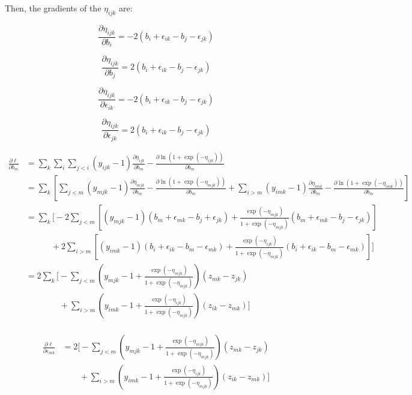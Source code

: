 \documentclass{article}
\begin{document}
Then, the gradients of the $\eta_{ijk}$ are:

\[
\frac{\partial \eta_{ijk}}{\partial b_{i}} =  - 2(b_i + \epsilon_{ik} - b_j - \epsilon_{jk})
\]

\[
\frac{\partial \eta_{ijk}}{\partial b_{j}} = 2(b_i + \epsilon_{ik} - b_j - \epsilon_{jk})
\]

\[
\frac{\partial \eta_{ijk}}{\partial \epsilon_{ik}} = - 2(b_i + \epsilon_{ik} - b_j - \epsilon_{jk})
\]

\[
\frac{\partial \eta_{ijk}}{\partial \epsilon_{jk}} = 2(b_i + \epsilon_{ik} - b_j - \epsilon_{jk})
\]

\begin{align*}
\frac{\partial \ell}{\partial b_{m}} & =  \sum_k \sum_{i}  \sum_{j<i} (y_{ijk} -1)\frac{\partial \eta_{ijk}}{\partial b_{m}} - \frac{\partial \ln (1+\exp(-\eta_{ijk}))}{\partial b_{m}} \\
& =  \sum_k\left[ \sum_{j<m} (y_{mjk} -1)\frac{\partial \eta_{mjk}}{\partial b_{m}} - \frac{\partial \ln (1+\exp(-\eta_{mjk}))}{\partial b_{m}} +  \sum_{i > m} (y_{imk} -1)\frac{\partial \eta_{imk}}{\partial b_{m}} - \frac{\partial \ln (1+\exp(-\eta_{imk}))}{\partial b_{m}} \right] \\
%
& =  \sum_k\bigg[ -2 \sum_{j<m} \left[(y_{mjk} -1)(b_m + \epsilon_{mk} - b_j + \epsilon_{jk}) + \frac{\exp(-\eta_{mjk})}{1+\exp(-\eta_{mjk})}(b_m + \epsilon_{mk} - b_j - \epsilon_{jk}) \right] \\
& \quad\quad\quad +  2 \sum_{i > m} \left[(y_{imk} -1)(b_i + \epsilon_{ik} - b_m - \epsilon_{mk}) +\frac{\exp(-\eta_{ijk})}{1+\exp(-\eta_{mjk})}(b_i + \epsilon_{ik} - b_m - \epsilon_{mk}) \right] \bigg] \\
& =  2 \sum_k\bigg[ - \sum_{j<m} \left(y_{mjk} -1 + \frac{\exp(-\eta_{mjk})}{1+\exp(-\eta_{mjk})}\right)(z_{mk} - z_{jk})\\
& \quad\quad\quad\quad +  \sum_{i > m} \left(y_{imk} -1 + \frac{\exp(-\eta_{ijk})}{1+\exp(-\eta_{mjk})}\right)(z_{ik} - z_{mk}) \bigg] \\
%
\end{align*}

\begin{align*}
\frac{\partial \ell}{\partial \epsilon_{mk}} & = 2 \bigg[ - \sum_{j<m} \left(y_{mjk} -1 + \frac{\exp(-\eta_{mjk})}{1+\exp(-\eta_{mjk})}\right)(z_{mk} - z_{jk})\\
& \quad\quad +  \sum_{i > m} \left(y_{imk} -1 + \frac{\exp(-\eta_{ijk})}{1+\exp(-\eta_{mjk})}\right)(z_{ik} - z_{mk}) \bigg]
\end{align*}
\end{document}
